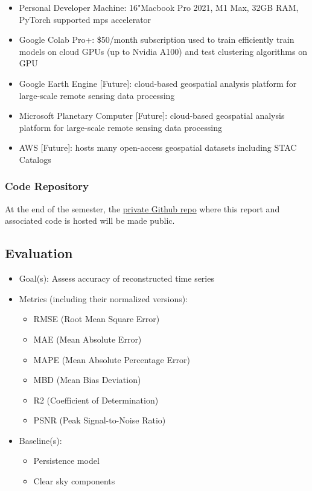 \begin{multicols}{2}
\begin{itemize}
    \item Personal Developer Machine: 16"Macbook Pro 2021, M1 Max, 32GB RAM, PyTorch supported mps accelerator
    \item Google Colab Pro+: \$50/month subscription used to train efficiently train models on cloud GPUs (up to Nvidia A100) and test clustering algorithms on GPU
    \item Google Earth Engine [Future]: cloud-based geospatial analysis platform for large-scale remote sensing data processing 
    \item Microsoft Planetary Computer [Future]: cloud-based geospatial analysis platform for large-scale remote sensing data processing
    \item AWS [Future]: hosts many open-access geospatial datasets including STAC Catalogs 
    
\end{itemize}

\subsubsection{Code Repository}

At the end of the semester, the \href{https://github.com/avega17/CCOM_MS_Spring_2025_EO_PV_research}{private Github repo} where this report and associated code is hosted will be made public.

\subsection{Evaluation}
    \begin{itemize}
        \item Goal(s): Assess accuracy of reconstructed time series 
        \item Metrics (including their normalized versions):
        \begin{itemize}
            \item RMSE (Root Mean Square Error)
            \item MAE (Mean Absolute Error)
            \item MAPE (Mean Absolute Percentage Error)
            \item MBD (Mean Bias Deviation)
            \item R2 (Coefficient of Determination)
            \item PSNR (Peak Signal-to-Noise Ratio)
        \end{itemize}
        \item Baseline(s):
            \begin{itemize}
                \item Persistence model 
                \item Clear sky components
            \end{itemize}
    \end{itemize}


\end{multicols}
